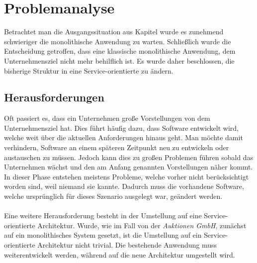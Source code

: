 \chapter{Problemanalyse}
\label{chap:analyse}
Betrachtet man die Ausgangssituation aus Kapitel  wurde es zunehmend schwieriger die monolithische Anwendung zu warten. Schließlich wurde die Entscheidung getroffen, dass eine klassische monolithische Anwendung, dem Unternehmensziel nicht mehr behilflich ist. Es wurde daher beschlossen, die bisherige Struktur in eine Service-orientierte zu ändern.

\section{Herausforderungen}
\label{sec:herausforderung}
Oft passiert es, dass ein Unternehmen große Vorstellungen von dem Unternehmensziel hat. Dies führt häufig dazu, dass Software entwickelt wird, welche weit über die aktuellen Anforderungen hinaus geht. Man möchte damit verhindern, Software an einem späteren Zeitpunkt neu zu entwickeln oder austauschen zu müssen. Jedoch kann dies zu großen Problemen führen sobald das Unternehmen wächst und den am Anfang genannten Vorstellungen näher kommt. In dieser Phase entstehen meistens Probleme, welche vorher nicht berücksichtigt worden sind, weil niemand sie kannte. Dadurch muss die vorhandene Software, welche ursprünglich für dieses Szenario ausgelegt war, geändert werden.
\\\\
Eine weitere Herausforderung besteht in der Umstellung auf eine Service-orientierte Architektur. Wurde, wie im Fall von der \textit{Auktionen GmbH}, zunächst auf ein monolithisches System gesetzt, ist die Umstellung auf ein Service-orientierte Architektur nicht trivial. Die bestehende Anwendung muss weiterentwickelt werden, während auf die neue Architektur umgestellt wird.

